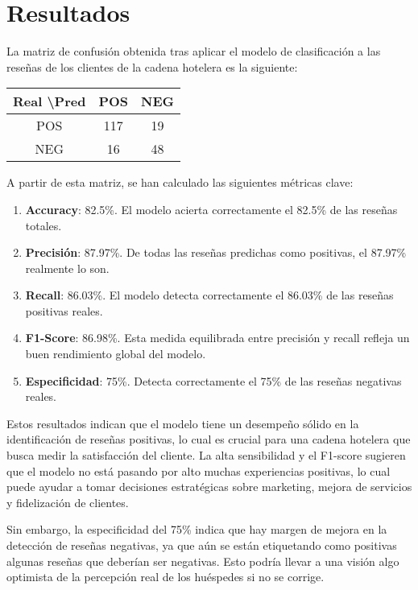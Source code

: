 \section{Resultados}


La matriz de confusión obtenida tras aplicar el modelo de clasificación a las reseñas de los clientes de la cadena hotelera es la siguiente:

\begin{tabular}{c|cc}
	Real \textbackslash Pred & POS & NEG \\
	\hline
	POS & 117 & 19 \\
	NEG & 16 & 48 \\
\end{tabular}

A partir de esta matriz, se han calculado las siguientes métricas clave:

\begin{enumerate}
	\item \textbf{Accuracy}: 82.5\%. El modelo acierta correctamente el 82.5\% de las reseñas totales.
	
	\item \textbf{Precisión}: 87.97\%. De todas las reseñas predichas como positivas, el 87.97\% realmente lo son.
	
	\item \textbf{Recall}: 86.03\%. El modelo detecta correctamente el 86.03\% de las reseñas positivas reales.
	
	\item \textbf{F1-Score}: 86.98\%. Esta medida equilibrada entre precisión y recall refleja un buen rendimiento global del modelo.
	
	\item \textbf{Especificidad}: 75\%. Detecta correctamente el 75\% de las reseñas negativas reales.
\end{enumerate}

Estos resultados indican que el modelo tiene un desempeño sólido en la identificación de reseñas positivas, lo cual es crucial para una cadena hotelera que busca medir la satisfacción del cliente. La alta sensibilidad y el F1-score sugieren que el modelo no está pasando por alto muchas experiencias positivas, lo cual puede ayudar a tomar decisiones estratégicas sobre marketing, mejora de servicios y fidelización de clientes.

Sin embargo, la especificidad del 75\% indica que hay margen de mejora en la detección de reseñas negativas, ya que aún se están etiquetando como positivas algunas reseñas que deberían ser negativas. Esto podría llevar a una visión algo optimista de la percepción real de los huéspedes si no se corrige.

